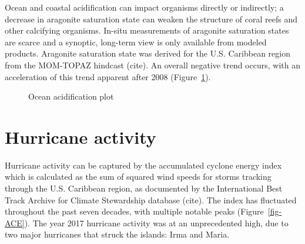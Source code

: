 \documentclass[
  letterpaper,
  oneside,
  open=any]{scrbook}
\begin{document}
Ocean and coastal acidification can impact organisms directly or
indirectly; a decrease in aragonite saturation state can weaken the
structure of coral reefs and other calcifying organisms. In-situ
measurements of aragonite saturation states are scarce and a synoptic,
long-term view is only available from modeled products. Aragonite
saturation state was derived for the U.S. Caribbean region from the
MOM-TOPAZ hindcast (cite). An overall negative trend occurs, with an
acceleration of this trend apparent after 2008 (Figure~\ref{fig-OA}).

\begin{figure}


\caption{\label{fig-OA}Ocean acidification plot}

\end{figure}%

\section{Hurricane activity}\label{hurricane-activity}

Hurricane activity can be captured by the accumulated cyclone energy
index which is calculated as the sum of squared wind speeds for storms
tracking through the U.S. Caribbean region, as documented by the
International Best Track Archive for Climate Stewardship database
(cite). The index has fluctuated throughout the past seven decades, with
multiple notable peaks (Figure~\ref{fig-ACE}). The year 2017 hurricane
activity was at an unprecedented high, due to two major hurricanes that
struck the islands: Irma and Maria.
\end{document}
